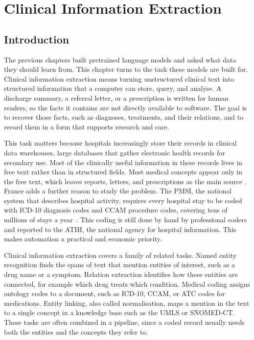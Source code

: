 \chapter{Clinical Information Extraction}
\label{chap:rw-ie}


\section{Introduction}
\label{sec:ie-intro}

The previous chapters built pretrained language models and asked what data they should learn
from. This chapter turns to the task these models are built for. Clinical information
extraction means turning unstructured clinical text into structured information that a computer
can store, query, and analyse. A discharge summary, a referral letter, or a prescription is
written for human readers, so the facts it contains are not directly available to software. The
goal is to recover those facts, such as diagnoses, treatments, and their relations, and to
record them in a form that supports research and care.

This task matters because hospitals increasingly store their records in clinical data
warehouses, large databases that gather electronic health records for secondary use. Most of
the clinically useful information in these records lives in free text rather than in structured
fields. Most medical concepts appear only in the free text, which leaves reports, letters, and
prescriptions as the main source \citep{raghavan_how_2014}.
France adds a further reason to study the problem. The PMSI, the national system that describes
hospital activity, requires every hospital stay to be coded with ICD-10 diagnosis codes and
CCAM procedure codes, covering tens of millions of stays a year~\citep{atih_pmsi}. This coding is still done by hand
by professional coders and reported to the ATIH, the national agency for hospital information.
This makes automation a practical and economic priority.

Clinical information extraction covers a family of related tasks. Named entity recognition finds
the spans of text that mention entities of interest, such as a drug name or a symptom. Relation
extraction identifies how these entities are connected, for example which drug treats which
condition. Medical coding assigns ontology codes to a document, such as ICD-10, CCAM, or ATC
codes for medications. Entity linking, also called normalisation, maps a mention in the text to
a single concept in a knowledge base such as the UMLS or SNOMED-CT. These tasks are often
combined in a pipeline, since a coded record usually needs both the entities and the concepts
they refer to.

